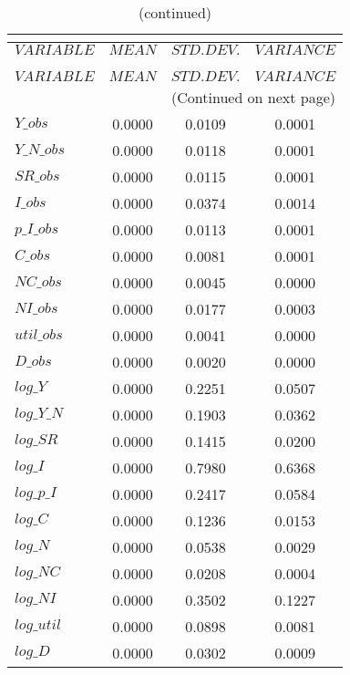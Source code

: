  
\begin{center}
\begin{longtable}{lccc} 
\caption{THEORETICAL MOMENTS}\\
 \label{Table:th_moments}\\
\toprule 
$VARIABLE   $	 & 	 $         MEAN$	 & 	 $    STD. DEV.$	 & 	 $     VARIANCE$\\
\midrule \endfirsthead 
\caption{(continued)}\\
 \toprule \\ 
$VARIABLE   $	 & 	 $         MEAN$	 & 	 $    STD. DEV.$	 & 	 $     VARIANCE$\\
\midrule \endhead 
\midrule \multicolumn{4}{r}{(Continued on next page)} \\ \bottomrule \endfoot 
\bottomrule \endlastfoot 
$Y\_obs     $	 & 	       0.0000	 & 	       0.0109	 & 	       0.0001 \\ 
$Y\_N\_obs  $	 & 	       0.0000	 & 	       0.0118	 & 	       0.0001 \\ 
$SR\_obs    $	 & 	       0.0000	 & 	       0.0115	 & 	       0.0001 \\ 
$I\_obs     $	 & 	       0.0000	 & 	       0.0374	 & 	       0.0014 \\ 
$p\_I\_obs  $	 & 	       0.0000	 & 	       0.0113	 & 	       0.0001 \\ 
$C\_obs     $	 & 	       0.0000	 & 	       0.0081	 & 	       0.0001 \\ 
$NC\_obs    $	 & 	       0.0000	 & 	       0.0045	 & 	       0.0000 \\ 
$NI\_obs    $	 & 	       0.0000	 & 	       0.0177	 & 	       0.0003 \\ 
$util\_obs  $	 & 	       0.0000	 & 	       0.0041	 & 	       0.0000 \\ 
$D\_obs     $	 & 	       0.0000	 & 	       0.0020	 & 	       0.0000 \\ 
$log\_Y     $	 & 	       0.0000	 & 	       0.2251	 & 	       0.0507 \\ 
$log\_Y\_N  $	 & 	       0.0000	 & 	       0.1903	 & 	       0.0362 \\ 
$log\_SR    $	 & 	       0.0000	 & 	       0.1415	 & 	       0.0200 \\ 
$log\_I     $	 & 	       0.0000	 & 	       0.7980	 & 	       0.6368 \\ 
$log\_p\_I  $	 & 	       0.0000	 & 	       0.2417	 & 	       0.0584 \\ 
$log\_C     $	 & 	       0.0000	 & 	       0.1236	 & 	       0.0153 \\ 
$log\_N     $	 & 	       0.0000	 & 	       0.0538	 & 	       0.0029 \\ 
$log\_NC    $	 & 	       0.0000	 & 	       0.0208	 & 	       0.0004 \\ 
$log\_NI    $	 & 	       0.0000	 & 	       0.3502	 & 	       0.1227 \\ 
$log\_util  $	 & 	       0.0000	 & 	       0.0898	 & 	       0.0081 \\ 
$log\_D     $	 & 	       0.0000	 & 	       0.0302	 & 	       0.0009 \\ 
\end{longtable}
 \end{center}
